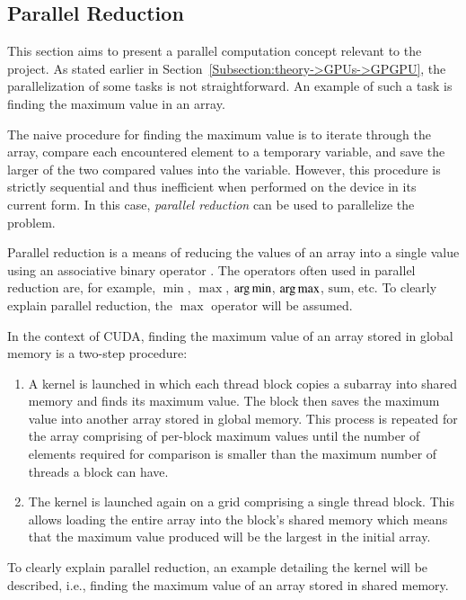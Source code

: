 \subsection{Parallel Reduction}\label{Subsection:theory->CUDA->parallel-reduction}
This section aims to present a parallel computation concept relevant to the project.
As stated earlier in Section~\ref{Subsection:theory->GPUs->GPGPU}, the parallelization of some tasks is not straightforward.
An example of such a task is finding the maximum value in an array.

The naive procedure for finding the maximum value is to iterate through the array, compare each encountered element to a temporary variable, and save the larger of the two compared values into the variable.
However, this procedure is strictly sequential and thus inefficient when performed on the device in its current form.
In this case, \textit{parallel reduction} can be used to parallelize the problem.

Parallel reduction is a means of reducing the values of an array into a single value using an associative binary operator \cite{Kirk2013}.
The operators often used in parallel reduction are, for example, $\min$, $\max$, $\operatorname*{arg\,min}$, $\operatorname*{arg\,max}$, $\mathrm{sum}$, etc.
To clearly explain parallel reduction, the $\max$ operator will be assumed.

In the context of CUDA, finding the maximum value of an array stored in global memory is a two-step procedure:

\begin{enumerate}
	\item A kernel is launched in which each thread block copies a subarray into shared memory and finds its maximum value.
The block then saves the maximum value into another array stored in global memory.
This process is repeated for the array comprising of per-block maximum values until the number of elements required for comparison is smaller than the maximum number of threads a block can have.
	\item The kernel is launched again on a grid comprising a single thread block.
This allows loading the entire array into the block's shared memory which means that the maximum value produced will be the largest in the initial array.
\end{enumerate}

To clearly explain parallel reduction, an example detailing the kernel will be described, i.e., finding the maximum value of an array stored in shared memory.

